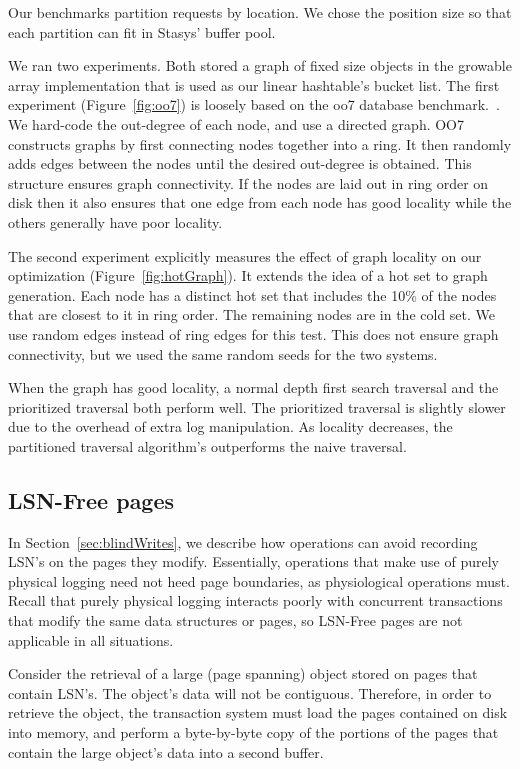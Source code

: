 \documentclass[letterpaper,twocolumn,10pt]{article}
\newcommand{\yads}{Stasys'\xspace}
\begin{document}
Our benchmarks partition requests by location.  We chose the
position size so that each partition can fit in \yads buffer pool.

We ran two experiments.  Both stored a graph of fixed size objects in
the growable array implementation that is used as our linear
hashtable's bucket list.
The first experiment (Figure~\ref{fig:oo7})
is loosely based on the oo7 database benchmark.~\cite{oo7}.  We
hard-code the out-degree of each node, and use a directed graph.  OO7
constructs graphs by first connecting nodes together into a ring.
It then randomly adds edges between the nodes until the desired
out-degree is obtained.  This structure ensures graph connectivity.
If the nodes are laid out in ring order on disk then it also ensures that
one edge from each node has good locality while the others generally
have poor locality.

The second experiment explicitly measures the effect of graph locality
on our optimization (Figure~\ref{fig:hotGraph}). It extends the idea
of a hot set to graph generation.  Each node has a distinct hot set
that includes the 10\% of the nodes that are closest to it in ring
order.  The remaining nodes are in the cold set.  We use random edges
instead of ring edges for this test.  This does not ensure graph
connectivity, but we used the same random seeds for the two systems.

When the graph has good locality, a normal depth first search
traversal and the prioritized traversal both perform well.  The
prioritized traversal is slightly slower due to the overhead of extra
log manipulation. As locality decreases, the partitioned traversal
algorithm's outperforms the naive traversal.


\subsection{LSN-Free pages}
\label{sec:zeroCopy}
In Section~\ref{sec:blindWrites}, we describe how operations can avoid recording
LSN's on the pages they modify.  Essentially, operations that make use
of purely physical logging need not heed page boundaries, as
physiological operations must.  Recall that purely physical logging
interacts poorly with concurrent transactions that modify the same
data structures or pages, so LSN-Free pages are not applicable in all
situations.

Consider the retrieval of a large (page spanning) object stored on
pages that contain LSN's.  The object's data will not be contiguous.
Therefore, in order to retrieve the object, the transaction system must
load the pages contained on disk into memory, and perform a byte-by-byte copy of the
portions of the pages that contain the large object's data into a second buffer.  
\end{document}

